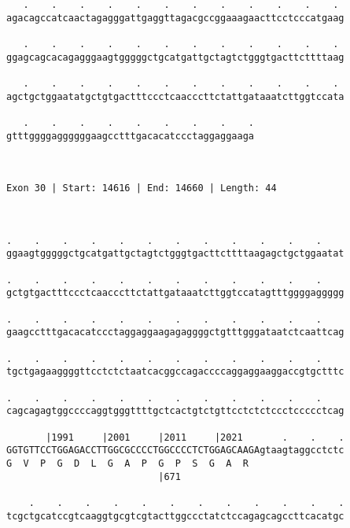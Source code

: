 \documentclass{article}
\begin{document}
\begin{Verbatim}
   .    .    .    .    .    .    .    .    .    .    .    . 
agacagccatcaactagagggattgaggttagacgccggaaagaacttcctcccatgaag
                                                            
   .    .    .    .    .    .    .    .    .    .    .    . 
ggagcagcacagagggaagtgggggctgcatgattgctagtctgggtgacttcttttaag
                                                            
   .    .    .    .    .    .    .    .    .    .    .    . 
agctgctggaatatgctgtgactttccctcaacccttctattgataaatcttggtccata
                                                            
   .    .    .    .    .    .    .    .    .
gtttggggaggggggaagcctttgacacatccctaggaggaaga
                                            
                                            
 
Exon 30 | Start: 14616 | End: 14660 | Length: 44



.    .    .    .    .    .    .    .    .    .    .    .    
ggaagtgggggctgcatgattgctagtctgggtgacttcttttaagagctgctggaatat
                                                            
.    .    .    .    .    .    .    .    .    .    .    .    
gctgtgactttccctcaacccttctattgataaatcttggtccatagtttggggaggggg
                                                            
.    .    .    .    .    .    .    .    .    .    .    .    
gaagcctttgacacatccctaggaggaagagaggggctgtttgggataatctcaattcag
                                                            
.    .    .    .    .    .    .    .    .    .    .    .    
tgctgagaaggggttcctctctaatcacggccagaccccaggaggaaggaccgtgctttc
                                                            
.    .    .    .    .    .    .    .    .    .    .    .    
cagcagagtggccccaggtgggttttgctcactgtctgttcctctctccctccccctcag
                                                            
       |1991     |2001     |2011     |2021       .    .    .
GGTGTTCCTGGAGACCTTGGCGCCCCTGGCCCCTCTGGAGCAAGAgtaagtaggcctctc
G  V  P  G  D  L  G  A  P  G  P  S  G  A  R                 
                           |671                             
  
    .    .    .    .    .    .    .    .    .    .    .    .
tcgctgcatccgtcaaggtgcgtcgtacttggccctatctccagagcagccttcacatgc
                                                            

\end{Verbatim}
\end{document}
